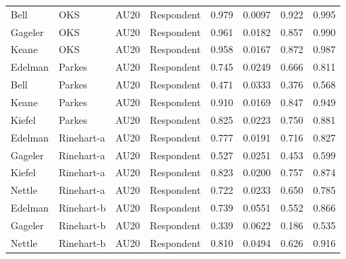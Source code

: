 \documentclass{monashthesis}
\begin{document}
\begin{center}
\begin{longtable}{llllllll}
Bell & OKS & AU20 & Respondent & 0.979 & 0.0097 & 0.922 & 0.995 \\
Gageler & OKS & AU20 & Respondent & 0.961 & 0.0182 & 0.857 & 0.990 \\
Keane & OKS & AU20 & Respondent & 0.958 & 0.0167 & 0.872 & 0.987 \\
Edelman & Parkes & AU20 & Respondent & 0.745 & 0.0249 & 0.666 & 0.811 \\
Bell & Parkes & AU20 & Respondent & 0.471 & 0.0333 & 0.376 & 0.568 \\
Keane & Parkes & AU20 & Respondent & 0.910 & 0.0169 & 0.847 & 0.949 \\
Kiefel & Parkes & AU20 & Respondent & 0.825 & 0.0223 & 0.750 & 0.881 \\
Edelman & Rinehart-a & AU20 & Respondent & 0.777 & 0.0191 & 0.716 & 0.827 \\
Gageler & Rinehart-a & AU20 & Respondent & 0.527 & 0.0251 & 0.453 & 0.599 \\
Kiefel & Rinehart-a & AU20 & Respondent & 0.823 & 0.0200 & 0.757 & 0.874 \\
Nettle & Rinehart-a & AU20 & Respondent & 0.722 & 0.0233 & 0.650 & 0.785 \\
Edelman & Rinehart-b & AU20 & Respondent & 0.739 & 0.0551 & 0.552 & 0.866 \\
Gageler & Rinehart-b & AU20 & Respondent & 0.339 & 0.0622 & 0.186 & 0.535 \\
Nettle & Rinehart-b & AU20 & Respondent & 0.810 & 0.0494 & 0.626 & 0.916 \\
\end{longtable}
\end{center}

\printbibliography[heading=bibintoc]
\end{document}
